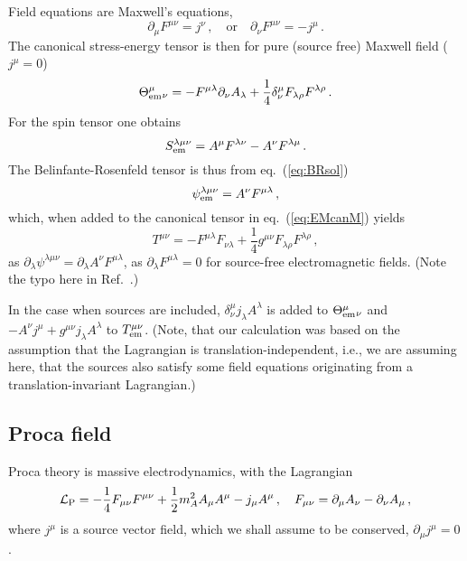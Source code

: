 \documentclass[a4paper,12pt]{article}
\def\lag{{\mathcal{L}}}
\begin{document}
Field equations are Maxwell's equations,
\begin{equation}\label{eq:Maxwell4}
 \partial_\mu F^{\mu\nu} = j^\nu\,,\quad\text{or}\quad \partial_\nu F^{\mu\nu}=-j^\mu\,.
\end{equation}
The canonical stress-energy tensor is then for pure (source free) Maxwell field ($j^\mu=0$)
\begin{equation}\label{eq:EMcanM}
 \Theta^\mu_{\rm em}{}_\nu = -F^{\mu\lambda}\partial_\nu A_\lambda +\frac{1}{4}\delta^\mu_\nu F_{\lambda\rho}F^{\lambda\rho}\,.
\end{equation}
For the spin tensor one obtains
\begin{equation}\label{eq:SpinAMM}
S^{\lambda\mu\nu}_{\rm em}  = A^\mu F^{\lambda\nu}-A^\nu F^{\lambda\mu}\,.
\end{equation}
The Belinfante-Rosenfeld tensor is thus from eq.\ (\ref{eq:BRsol})
\begin{equation}\label{eq:BRsolM}
 \psi_{\rm em}^{\lambda\mu\nu} = A^\nu F^{\mu\lambda}\,,
\end{equation}
which, when added to the canonical tensor in eq.\ (\ref{eq:EMcanM}) yields
\begin{equation}\label{eq:SymmM}
 T^{\mu\nu} = -F^{\mu\lambda}F_{\nu\lambda} +\frac{1}{4}g^{\mu\nu} F_{\lambda\rho}F^{\lambda\rho}\,,
\end{equation}
as $\partial_\lambda \psi^{\lambda\mu\nu} = \partial_\lambda A^\nu F^{\mu\lambda}$, as $\partial_\lambda F^{\mu\lambda}=0$ for source-free electromagnetic fields. (Note the typo here in Ref.\ \cite{LL2}.)

In the case when sources are included, $\delta^\mu_\nu j_\lambda A^\lambda$ is added to $\Theta^{\mu}_{\rm em}{}_\nu$ and $-A^\nu j^\mu +g^{\mu\nu} j_\lambda A^\lambda$ to $T^{\mu\nu}_{\rm em}$. (Note, that our calculation was based on the assumption that the Lagrangian is translation-independent, i.e., we are assuming here, that the sources also satisfy some field equations originating from a translation-invariant Lagrangian.)

\subsection{Proca field}\label{ssec:Proca}
Proca theory is massive electrodynamics, with the Lagrangian
\begin{equation}\label{eq:LagP}
 \lag_{\rm P} = -\frac{1}{4}F_{\mu\nu}F^{\mu\nu} +\frac{1}{2}m_A^2 A_\mu A^\mu -j_\mu A^\mu\,,\quad F_{\mu\nu}=\partial_\mu A_\nu - \partial_\nu A_\mu\,,
\end{equation}
where $j^\mu$ is a source vector field, which we shall assume to be conserved, $\partial_\mu j^\mu =0$.
\end{document}
